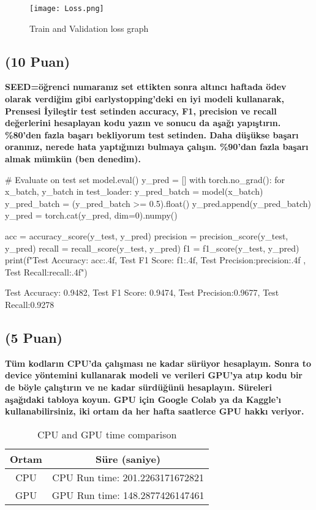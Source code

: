 \documentclass[11pt]{article}
\begin{document}
\begin{figure}[ht!]
    \centering
    \texttt{[image: Loss.png]}
    \caption{Train and Validation loss graph}
    \label{fig:my_pic}
\end{figure}

\newpage
\subsection{(10 Puan)} \textbf{SEED=öğrenci numaranız set ettikten sonra altıncı haftada ödev olarak verdiğim gibi earlystopping'deki en iyi modeli kullanarak, Prensesi İyileştir test setinden accuracy, F1, precision ve recall değerlerini hesaplayan kodu yazın ve sonucu da aşağı yapıştırın. \%80'den fazla başarı bekliyorum test setinden. Daha düşükse başarı oranınız, nerede hata yaptığınızı bulmaya çalışın. \%90'dan fazla başarı almak mümkün (ben denedim).}

\begin{python}
# Evaluate on test set
model.eval()
y_pred = []
with torch.no_grad():
    for x_batch, y_batch in test_loader:
        y_pred_batch = model(x_batch)
        y_pred_batch = (y_pred_batch >= 0.5).float()
        y_pred.append(y_pred_batch)
y_pred = torch.cat(y_pred, dim=0).numpy()

acc = accuracy_score(y_test, y_pred)
precision = precision_score(y_test, y_pred)
recall = recall_score(y_test, y_pred)
f1 = f1_score(y_test, y_pred)
print(f"Test Accuracy: {acc:.4f}, Test F1 Score: {f1:.4f}, Test Precision:{precision:.4f} , Test Recall:{recall:.4f}")
\end{python}

Test Accuracy: 0.9482, Test F1 Score: 0.9474, Test Precision:0.9677, Test Recall:0.9278
\newpage
\subsection{(5 Puan)} \textbf{Tüm kodların CPU'da çalışması ne kadar sürüyor hesaplayın. Sonra to device yöntemini kullanarak modeli ve verileri GPU'ya atıp kodu bir de böyle çalıştırın ve ne kadar sürdüğünü hesaplayın. Süreleri aşağıdaki tabloya koyun. GPU için Google Colab ya da Kaggle'ı kullanabilirsiniz, iki ortam da her hafta saatlerce GPU hakkı veriyor.}

\begin{table}[ht!]
    \centering
    \caption{CPU and GPU time comparison}
    \begin{tabular}{c|c}
        Ortam & Süre (saniye) \\\hline
        CPU & CPU Run time: 201.2263171672821\\
        GPU & GPU Run time: 148.2877426147461\\
    \end{tabular}
    \label{tab:my_table}
\end{table}
\end{document}
